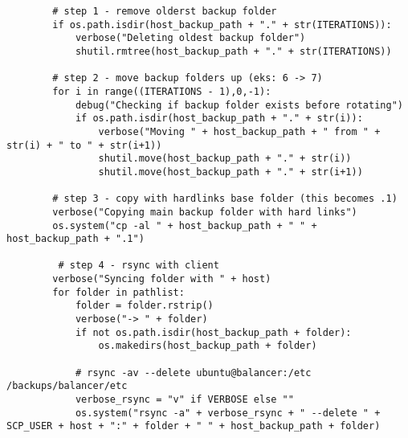 \begin{lstlisting}
        # step 1 - remove olderst backup folder
        if os.path.isdir(host_backup_path + "." + str(ITERATIONS)):
            verbose("Deleting oldest backup folder")
            shutil.rmtree(host_backup_path + "." + str(ITERATIONS))

        # step 2 - move backup folders up (eks: 6 -> 7)
        for i in range((ITERATIONS - 1),0,-1):
            debug("Checking if backup folder exists before rotating")
            if os.path.isdir(host_backup_path + "." + str(i)):
                verbose("Moving " + host_backup_path + " from " + str(i) + " to " + str(i+1))
                shutil.move(host_backup_path + "." + str(i))
                shutil.move(host_backup_path + "." + str(i+1))

        # step 3 - copy with hardlinks base folder (this becomes .1)
        verbose("Copying main backup folder with hard links")
        os.system("cp -al " + host_backup_path + " " + host_backup_path + ".1")

         # step 4 - rsync with client
        verbose("Syncing folder with " + host)
        for folder in pathlist:
            folder = folder.rstrip()
            verbose("-> " + folder)
            if not os.path.isdir(host_backup_path + folder):
                os.makedirs(host_backup_path + folder)

            # rsync -av --delete ubuntu@balancer:/etc /backups/balancer/etc
            verbose_rsync = "v" if VERBOSE else ""
            os.system("rsync -a" + verbose_rsync + " --delete " + SCP_USER + host + ":" + folder + " " + host_backup_path + folder)
\end{lstlisting}
